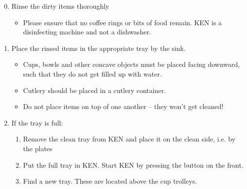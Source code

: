 \documentclass{article}
\begin{document}

\maketitle

\fontsize{18}{18}\selectfont

\begin{enumerate}

\setcounter{enumi}{-1}

\bfseries \item Rinse the dirty items thoroughly \normalfont
\begin{itemize}

\item Please ensure that no coffee rings or bits of food remain. KEN is a
disinfecting machine and not a dishwasher.

\end{itemize}

\bfseries \item Place the rinsed items in the appropriate tray by the sink.
\normalfont

\begin{itemize}

\item Cups, bowls and other concave objects must be placed facing downward,
such that they do not get filled up with water.

\item Cutlery should be placed in a cutlery container.

\item Do not place items on top of one another -- they won't get cleaned!

\end{itemize}

\bfseries \item If the tray is full: \normalfont

\begin{enumerate}

\item Remove the clean tray from KEN and place it on the clean side, i.e. by
the plates

\item Put the full tray in KEN. Start KEN by pressing the button on the front.

\item Find a new tray. These are located above the cup trolleys.

\end{enumerate}


\end{enumerate}
\end{document}
